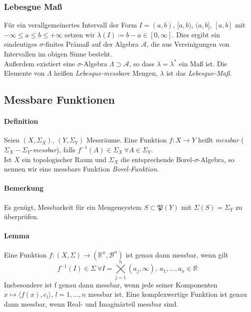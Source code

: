 \documentclass[12pt,a4paper,fleqn]{article}
\begin{document}
\subsubsection*{Lebesgue Maß}
Für ein verallgemeinertes Intervall der Form $I = (a, b)$, $[a, b)$, $(a, b]$, $[a, b]$ mit\linebreak \mbox{$-\infty \leq a \leq b \leq +\infty$} setzen wir $\lambda(I) \coloneqq b - a \in [0, \infty]$. Dies ergibt ein eindeutiges $\sigma$-finites Prämaß auf der Algebra $\mathcal{A}$, die aus Vereinigungen von Intervallen im obigen Sinne besteht.\\
Außerdem existiert eine $\sigma$-Algebra $\Lambda \supset \mathcal{A}$, so dass $\lambda = \lambda^*$ ein Maß ist. Die Elemente von $\Lambda$ heißen \textit{Lebesgue-messbare} Mengen, $\lambda$ ist das \textit{Lebesgue-Maß}.

\subsection{Messbare Funktionen}
\paragraph{Definition} Seien $(X, \Sigma_X)$, $(Y, \Sigma_Y)$ Messräume. Eine Funktion $f\colon X \rightarrow Y$ heißt \textit{messbar} ($\Sigma_X-\Sigma_Y$-\textit{messbar}), falls $f^{-1}(A) \in \Sigma_X \ \forall A \in \Sigma_Y$.\\
Ist $X$ ein topologischer Raum und $\Sigma_X$ die entsprechende Borel-$\sigma$-Algebra, so nennen wir eine messbare Funktion \textit{Borel-Funktion}.

\paragraph{Bemerkung} Es genügt, Messbarkeit für ein Mengensystem $S \subset \mathfrak{P}(Y)$ mit ${\Sigma(S) = \Sigma_Y}$ zu überprüfen.

\paragraph{Lemma} Eine Funktion $f\colon (X, \Sigma)\rightarrow (\mathbb{R}^n, \mathcal{B}^n)$ ist genau dann messbar, wenn gilt
\begin{displaymath}
f^{-1} (I) \in \Sigma \ \forall I = \bigtimes\limits_{j = 1}^n (a_j, \infty),\ a_1, \dots, a_n \in \mathbb{R}
\end{displaymath}
Insbesondere ist f genau dann messbar, wenn jede seiner Komponenten $x \mapsto \langle f(x), e_l \rangle$, $l = 1, \dots, n$ messbar ist. Eine komplexwertige Funktion ist genau dann messbar, wenn Real- und Imaginärteil messbar sind.
\end{document}

